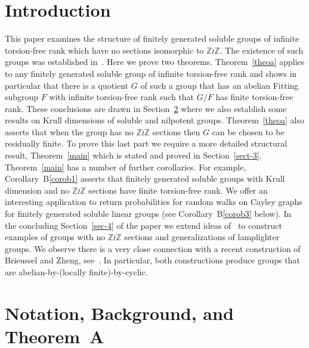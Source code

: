 \documentclass[11pt]{article}
\theoremstyle{definition}
\numberwithin{equation}{section}
\numberwithin{figure}{section}
\numberwithin{table}{section}
\newcommand{\Z}{\mathbb{Z}}
\begin{document}
\section{Introduction}

This paper examines the structure of finitely generated soluble groups of infinite torsion-free rank which have no sections isomorphic to $\Z\wr\Z$. The existence of such groups was established in~\cite{K2}. Here we prove two theorems. Theorem~\ref{theoa} applies to any finitely generated soluble group of infinite torsion-free rank and shows in particular that there is a quotient $G$ of such a group that has an abelian Fitting subgroup $F$ with infinite torsion-free rank such that $G/F$ has finite torsion-free rank. These conclusions are drawn in Section~\ref{sec-2} where we also establish some results on Krull dimensions of soluble and nilpotent groups. Theorem~\ref{theoa} also asserts that when the group has no $\Z\wr\Z$ sections then $G$ can be chosen to be residually finite. To prove this last part we require a more detailed structural result, Theorem~\ref{main} which is stated and proved in Section~\ref{sect-3}. Theorem~\ref{main} has a number of further corollaries. For example, Corollary~B\ref{corob1} asserts that finitely generated soluble groups with Krull dimension and no $\Z\wr\Z$ sections have finite torsion-free rank. We offer an interesting application to return probabilities for random walks on Cayley graphs for finitely generated soluble linear groups (see Corollary~B\ref{corob3} below). In the concluding Section~\ref{sec-4} of the paper we extend ideas of~\cite{K2} to construct examples of groups with no $\Z\wr\Z$ sections and generalizations of lamplighter groups. We observe there is a very close connection with a recent construction of Brieussel and Zheng, see~\cite{Brieussel,BZ}. In particular, both constructions produce groups that are abelian-by-(locally finite)-by-cyclic.



\section{Notation, Background, and Theorem~A}\label{sec-2}
\end{document}
